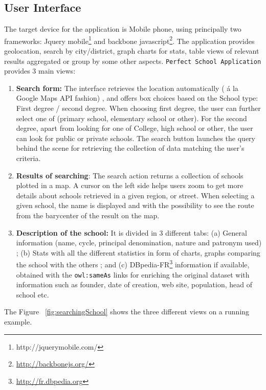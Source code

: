 \subsection{User Interface}
The target device for the application is Mobile phone, using principally two frameworks: Jquery mobile\footnote{http://jquerymobile.com/} and  backbone javascript\footnote{\url{http://backbonejs.org/}}. 
The application provides geolocation, search by city/district, graph charts for stats, table views of relevant results aggregated or group by some other aspects. 
\texttt{Perfect School Application} provides 3 main views:
\begin{enumerate}
\item \textbf{Search form:} The interface retrieves the location automatically ( \'{a} la Google Maps API fashion) , and offers box choices based on the School type: First degree / second degree. When choosing first degree, the user can further select one of (primary school, elementary school or other). For the second degree, apart from looking for one of College, high school or other, the user can look for public or private schools. The search button launches the query behind the scene for retrieving the collection of data matching the user's criteria. 

\item \textbf{Results of searching}: The search action returns a collection of schools plotted in a map. A cursor on the left side helps users zoom to get more details about schools retrieved in a given region, or street. When selecting a given school, the name is displayed and with the possibility to see the route from the barycenter of the result on the map.
\item \textbf{Description of the school:} It is divided in 3 different tabs: (a) General information (name, cycle, principal denomination, nature and patronym used) ; (b) Stats with all the different statistics in form of charts, graphs comparing the school with the others ; and (c) DBpedia-FR\footnote{\url{http://fr.dbpedia.org}} information if available, obtained with the \texttt{owl:sameAs} links for enriching the original dataset with  information such as founder, date of creation, web site, population, head of school etc.

\end{enumerate}

The Figure ~\ref{fig:searchingSchool} shows the three different views on a running example.


